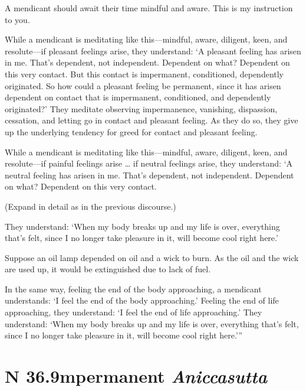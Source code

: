 \documentclass[12pt,openany]{book}%
\newcommand*{\suttatitleacronym}[1]{\smaller[2]{#1}\vspace*{.3em}}
\newcommand*{\suttatitletranslation}[1]{\linebreak{#1}}
\newcommand*{\suttatitleroot}[1]{\linebreak\smaller[2]\itshape{#1}}
\newcommand*{\tocacronym}[1]{\hspace*{-3.3em}{#1}\quad}
\newcommand*{\toctranslation}[1]{#1}
\newcommand*{\tocroot}[1]{(\textit{#1})}
\begin{document}
A mendicant should await their time mindful and aware. This is my instruction to you. 

While a mendicant is meditating like this—mindful, aware, diligent, keen, and resolute—if pleasant feelings arise, they understand: ‘A pleasant feeling has arisen in me. That’s dependent, not independent. Dependent on what? Dependent on this very contact. But this contact is impermanent, conditioned, dependently originated. So how could a pleasant feeling be permanent, since it has arisen dependent on contact that is impermanent, conditioned, and dependently originated?’ They meditate observing impermanence, vanishing, dispassion, cessation, and letting go in contact and pleasant feeling. As they do so, they give up the underlying tendency for greed for contact and pleasant feeling. 

While a mendicant is meditating like this—mindful, aware, diligent, keen, and resolute—if painful feelings arise … if neutral feelings arise, they understand: ‘A neutral feeling has arisen in me. That’s dependent, not independent. Dependent on what? Dependent on this very contact. 

(Expand in detail as in the previous discourse.) 

They understand: ‘When my body breaks up and my life is over, everything that’s felt, since I no longer take pleasure in it, will become cool right here.’ 

Suppose an oil lamp depended on oil and a wick to burn. As the oil and the wick are used up, it would be extinguished due to lack of fuel. 

In the same way, feeling the end of the body approaching, a mendicant understands: ‘I feel the end of the body approaching.’ Feeling the end of life approaching, they understand: ‘I feel the end of life approaching.’ They understand: ‘When my body breaks up and my life is over, everything that’s felt, since I no longer take pleasure in it, will become cool right here.’” 

%
\section*{{\suttatitleacronym SN 36.9}{\suttatitletranslation Impermanent }{\suttatitleroot Aniccasutta}}
\addcontentsline{toc}{section}{\tocacronym{SN 36.9} \toctranslation{Impermanent } \tocroot{Aniccasutta}}
\end{document}
